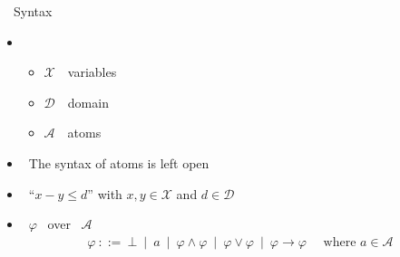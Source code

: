 \newcommand{\Variables}{\ensuremath{\mathcal{X}}}
\newcommand{\Domain}{\ensuremath{\mathcal{D}}}
\newcommand{\Atoms}{\ensuremath{\mathcal{A}}}
\newcommand{\ThAt}{\mathit{a}}
\newcommand{\Undefined}{\ensuremath{\boldsymbol{u}}}
\newcommand{\val}{v}
\newcommand{\den}[1]{\llbracket \, #1 \, \rrbracket}

\begin{frame}{\HTC\ \ Syntax}
  \begin{itemize}
  \item {} \ \tuple{\Variables,\Domain,\Atoms}
    \begin{itemize}
    \item \Variables\ \ variables
    \item \Domain\    \ domain
    \item \Atoms\     \ atoms
    \end{itemize}
    \smallskip
  \item<2->  \ The syntax of atoms is left open
  \item<2->  \ ``$x - y \leq d$'' with $x, y \in \Variables$ and $d \in \Domain$
    \medskip
  \item<3->  \ $\varphi$ \ over \ \Atoms\
    \begin{align*}
      \varphi \ ::= \ \bot \ \mid \ \ThAt\ \mid \ \varphi \land \varphi \ \mid \  \varphi \lor \varphi \ \mid \  \varphi \rightarrow \varphi \quad\text{ where } \ThAt \in \Atoms
    \end{align*}

  \end{itemize}
\end{frame}

